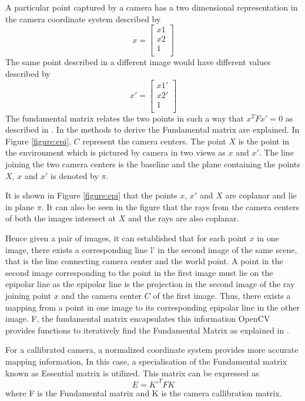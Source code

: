 A particular point captured by a camera has a two dimensional representation in the camera coordinate system described by 
	\[
  x=
  \left[ {\begin{array}{c}
    x1 \\
   x2  \\
	1 \\
  \end{array} } \right]
\] 
The same point described in a different image would have different values described by 
\[
  x'=
  \left[ {\begin{array}{c}
    x1' \\
   x2'  \\
	1 \\
  \end{array} } \right]
\] 
The fundamental matrix relates the two points in such a way that \(x^{T}Fx'=0 \) as described in \cite{hartley2003multiple}.
In \cite{torr1997development,hartley2003multiple} the methods to derive the Fundamental matrix are explained.
In Figure \ref{figure:epi}, $C$ represent the camera centers. The point $X$ is the point in the environment which is pictured by camera in two views as $x$ and $x'$. The line joining the two camera centers is the baseline and the plane containing the points $X$, $x$ and $x'$ is denoted by $\pi$. 

  It is shown in Figure \ref{figure:epi} that the points $x$, $x'$ and $X$ are coplanar and lie in plane $\pi$. It can also  be seen in the figure that the rays from the camera centers of both the images intersect at $X$ and the rays are also coplanar.


Hence given a pair of images, it can established that for each point $x$  in one image, there exists a corresponding line l' in the second image of the same scene, that is the line connecting camera center and the world point. A point in the second image corresponding to the point in the first image must lie on the epipolar line as the epipolar line is the projection in the second image of the ray joining point $x$ and the camera center $C$ of the first image. Thus, there exists a mapping from a point in one image to its corresponding epipolar line in the other image. F, the fundamental matrix encapsulates this information
OpenCV provides functions to iteratively find the Fundamental Matrix as explained in \cite{hartley2003multiple}. 


For a callibrated camera, a normalized coordinate system provides more accurate mapping information, In this case, a specialisation of the Fundamental matrix known as Essential matrix is utilized. This matrix can be expressed as  \[ E = {K'}^T F K\] where F is the Fundamental matrix and K is the camera callibration matrix.

